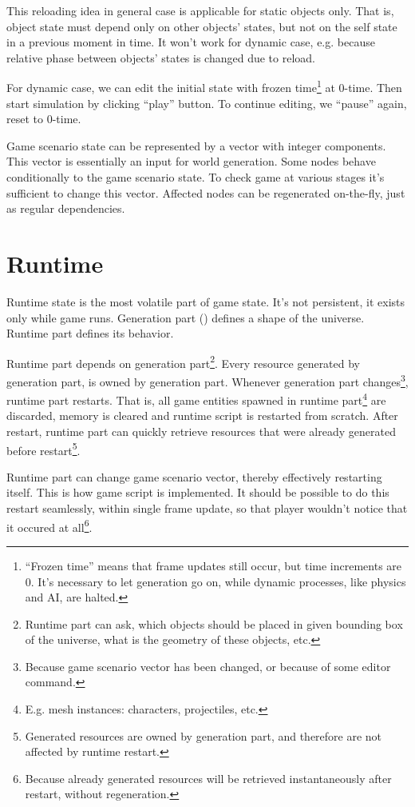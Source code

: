 \documentclass[12pt]{article}
\begin{document}
This reloading idea in general case is applicable for static objects only.
That is, object state must depend only on other objects' states, but
not on the self state in a previous moment in time.
It won't work for dynamic case, e.g. because relative phase between
objects' states is changed due to reload.

For dynamic case, we can edit the initial state with frozen time\footnote{
    ``Frozen time'' means that frame updates still occur, but
    time increments are 0.
    It's necessary to let generation go on, while dynamic processes, like
    physics and AI, are halted.
} at 0-time.
Then start simulation by clicking ``play'' button.
To continue editing, we ``pause'' again, reset to 0-time.

Game scenario state can be represented by a vector with integer components.
This vector is essentially an input for world generation.
Some nodes behave conditionally to the game scenario state.
To check game at various stages it's sufficient to change this vector.
Affected nodes can be regenerated on-the-fly, just as regular dependencies.

\section{Runtime}

Runtime state is the most volatile part of game state.
It's not persistent, it exists only while game runs.
Generation part () defines a shape of the universe.
Runtime part defines its behavior.

Runtime part depends on generation part\footnote{
    Runtime part can ask, which objects should be placed in given
    bounding box of the universe, what is the geometry of these objects,
    etc.
}.
Every resource generated by generation part, is owned by generation part.
Whenever generation part changes\footnote{
    Because game scenario vector has been changed, or
    because of some editor command.
}, runtime part restarts.
That is, all game entities spawned in runtime part\footnote{
    E.g. mesh instances: characters, projectiles, etc.
} are discarded, memory is cleared and runtime script is restarted from scratch.
After restart, runtime part can quickly retrieve resources that were
already generated before restart\footnote{
    Generated resources are owned by generation part, and therefore are
    not affected by runtime restart.
}.

Runtime part can change game scenario vector, thereby effectively
restarting itself.
This is how game script is implemented.
It should be possible to do this restart seamlessly, within single frame update,
so that player wouldn't notice that it occured at all\footnote{
    Because already generated resources will be retrieved instantaneously
    after restart, without regeneration.
}.
\end{document}
